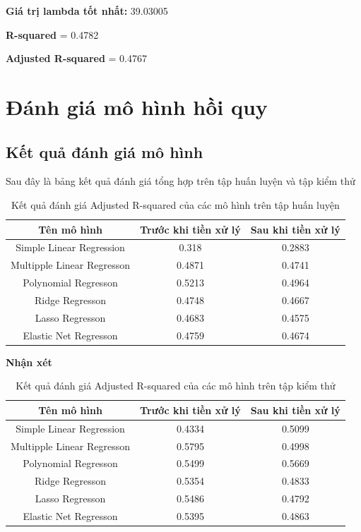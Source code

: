 \documentclass[runningheads]{llncs}
\begin{document}
\textbf{Giá trị lambda tốt nhất:} 39.03005

\textbf{R-squared} = 0.4782

\textbf{Adjusted R-squared} = 0.4767 


\section{Đánh giá mô hình hồi quy}

\subsection{Kết quả đánh giá mô hình}

Sau đây là bảng kết quả đánh giá tổng hợp trên tập huấn luyện và tập kiểm thử

\begin{table}[H]
	\setlength{\tabcolsep}{0.5em}
	\renewcommand{\arraystretch}{1.2}
	\begin{center}
		\caption{Kết quả đánh giá Adjusted R-squared của các mô hình trên tập huấn luyện}\label{tab3}
		\begin{tabular}{|c|c|c|}
			\hline
			Tên mô hình&Trước khi tiền xử lý&Sau khi tiền xử lý\\
			\hline
			Simple Linear Regression&0.318&0.2883\\
			\hline
			Multipple Linear Regresson&0.4871&0.4741\\
			\hline
			Polynomial Regresson&0.5213&0.4964\\
			\hline
			Ridge Regresson&0.4748&0.4667\\
			\hline
			Lasso Regresson&0.4683&0.4575\\
			\hline
			Elastic Net Regresson&0.4759&0.4674\\
			\hline
		\end{tabular}			
	\end{center}
\end{table}

\textbf{Nhận xét}

\begin{table}[H]
	\setlength{\tabcolsep}{0.5em}
	\renewcommand{\arraystretch}{1.2}
	\begin{center}
		\caption{Kết quả đánh giá Adjusted R-squared của các mô hình trên tập kiểm thử}\label{tab3}
		\begin{tabular}{|c|c|c|}
			\hline
			Tên mô hình&Trước khi tiền xử lý&Sau khi tiền xử lý\\
			\hline
			Simple Linear Regression&0.4334&0.5099\\
			\hline
			Multipple Linear Regresson&0.5795&0.4998\\
			\hline
			Polynomial Regresson&0.5499&0.5669\\
			\hline
			Ridge Regresson&0.5354&0.4833\\
			\hline
			Lasso Regresson&0.5486&0.4792\\
			\hline
			Elastic Net Regresson&0.5395&0.4863\\
			\hline
		\end{tabular}			
	\end{center}
\end{table}
\end{document}
